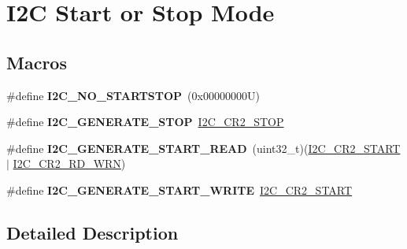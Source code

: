 \hypertarget{group___i2_c___s_t_a_r_t___s_t_o_p___m_o_d_e}{}\section{I2C Start or Stop Mode}
\label{group___i2_c___s_t_a_r_t___s_t_o_p___m_o_d_e}
\subsection*{Macros}
\begin{DoxyCompactItemize}
\item 
\mbox{\label{group___i2_c___s_t_a_r_t___s_t_o_p___m_o_d_e_ga72be0683a5cddcd2eb8d09034becf0f8}} 
\#define {\bfseries I2\+C\+\_\+\+N\+O\+\_\+\+S\+T\+A\+R\+T\+S\+T\+OP}~(0x00000000\+U)
\item 
\mbox{\label{group___i2_c___s_t_a_r_t___s_t_o_p___m_o_d_e_gabd6e763d5c32da220e64aa6e726ebad8}} 
\#define {\bfseries I2\+C\+\_\+\+G\+E\+N\+E\+R\+A\+T\+E\+\_\+\+S\+T\+OP}~\hyperlink{group___peripheral___registers___bits___definition_ga37007be453dd8a637be2d793d3b5f2a2}{I2\+C\+\_\+\+C\+R2\+\_\+\+S\+T\+OP}
\item 
\mbox{\label{group___i2_c___s_t_a_r_t___s_t_o_p___m_o_d_e_ga3ec0ba1daf9639ed559f829a5b95549b}} 
\#define {\bfseries I2\+C\+\_\+\+G\+E\+N\+E\+R\+A\+T\+E\+\_\+\+S\+T\+A\+R\+T\+\_\+\+R\+E\+AD}~(uint32\+\_\+t)(\hyperlink{group___peripheral___registers___bits___definition_ga5ac78b87a12a9eaf564f5a3f99928478}{I2\+C\+\_\+\+C\+R2\+\_\+\+S\+T\+A\+RT} $\vert$ \hyperlink{group___peripheral___registers___bits___definition_ga268ec714bbe4a75ea098c0e230a87697}{I2\+C\+\_\+\+C\+R2\+\_\+\+R\+D\+\_\+\+W\+RN})
\item 
\mbox{\label{group___i2_c___s_t_a_r_t___s_t_o_p___m_o_d_e_ga727eba0ee24dbd8b0f5110f242712ea1}} 
\#define {\bfseries I2\+C\+\_\+\+G\+E\+N\+E\+R\+A\+T\+E\+\_\+\+S\+T\+A\+R\+T\+\_\+\+W\+R\+I\+TE}~\hyperlink{group___peripheral___registers___bits___definition_ga5ac78b87a12a9eaf564f5a3f99928478}{I2\+C\+\_\+\+C\+R2\+\_\+\+S\+T\+A\+RT}
\end{DoxyCompactItemize}


\subsection{Detailed Description}
